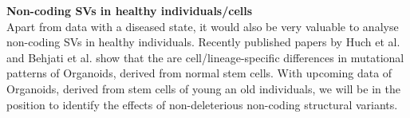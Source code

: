 \documentclass[twoside,fontsize=12pt]{article}
\begin{document}
\medskip

\noindent
\textbf{Non-coding SVs in healthy individuals/cells} \\
Apart from data with a diseased state, it would also be very valuable to analyse non-coding SVs in healthy individuals. Recently published papers by Huch et al. and Behjati et al.\cite{Huch2014,Behjati2014} show that the are cell/lineage-specific differences in mutational patterns of Organoids, derived from normal stem cells. With upcoming data of Organoids, derived from stem cells of young an old individuals, we will be in the position to identify the effects of non-deleterious non-coding structural variants.
%
\end{document}
